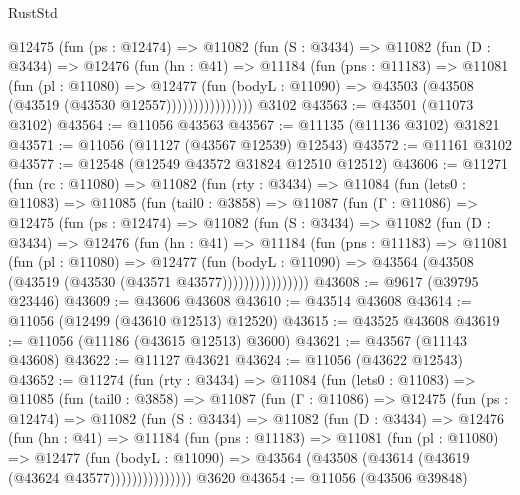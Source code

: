 \begin{lexlean}{RustStd}
\begin{coremodule}
              @12475
                (fun (ps : @12474) =>
                @11082
                  (fun (S : @3434) =>
                  @11082
                    (fun (D : @3434) =>
                    @12476
                      (fun (hn : @41) =>
                      @11184
                        (fun (pns : @11183) =>
                        @11081
                          (fun (pl : @11080) =>
                          @12477
                            (fun (bodyL : @11090) =>
                            @43503 (@43508 (@43519 (@43530 @12557))))))))))))))))
    @3102
@43563 := @43501 (@11073 @3102)
@43564 := @11056 @43563
@43567 := @11135 (@11136 @3102) @31821
@43571 := @11056 (@11127 (@43567 @12539) @12543)
@43572 := @11161 @3102
@43577 := @12548 (@12549 @43572 @31824 @12510 @12512)
@43606 := @11271
    (fun (rc : @11080) =>
    @11082
      (fun (rty : @3434) =>
      @11084
        (fun (lets0 : @11083) =>
        @11085
          (fun (tail0 : @3858) =>
          @11087
            (fun (Γ : @11086) =>
            @12475
              (fun (ps : @12474) =>
              @11082
                (fun (S : @3434) =>
                @11082
                  (fun (D : @3434) =>
                  @12476
                    (fun (hn : @41) =>
                    @11184
                      (fun (pns : @11183) =>
                      @11081
                        (fun (pl : @11080) =>
                        @12477
                          (fun (bodyL : @11090) =>
                          @43564 (@43508 (@43519 (@43530 (@43571 @43577))))))))))))))))
@43608 := @9617 (@39795 @23446)
@43609 := @43606 @43608
@43610 := @43514 @43608
@43614 := @11056 (@12499 (@43610 @12513) @12520)
@43615 := @43525 @43608
@43619 := @11056 (@11186 (@43615 @12513) @3600)
@43621 := @43567 (@11143 @43608)
@43622 := @11127 @43621
@43624 := @11056 (@43622 @12543)
@43652 := @11274
    (fun (rty : @3434) =>
    @11084
      (fun (lets0 : @11083) =>
      @11085
        (fun (tail0 : @3858) =>
        @11087
          (fun (Γ : @11086) =>
          @12475
            (fun (ps : @12474) =>
            @11082
              (fun (S : @3434) =>
              @11082
                (fun (D : @3434) =>
                @12476
                  (fun (hn : @41) =>
                  @11184
                    (fun (pns : @11183) =>
                    @11081
                      (fun (pl : @11080) =>
                      @12477
                        (fun (bodyL : @11090) =>
                        @43564 (@43508 (@43614 (@43619 (@43624 @43577)))))))))))))))
    @3620
@43654 := @11056 (@43506 @39848)

\end{coremodule}
\end{lexlean}
